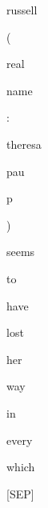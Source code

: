 \documentclass[varwidth=150mm]{standalone}
\begin{document}
\begin{CJK*}{UTF8}{gbsn}
{{{\colorbox{red!6.251659393310547}{\strut russell} \colorbox{red!24.858978271484375}{\strut (} \colorbox{red!7.129275321960449}{\strut real} \colorbox{red!2.2108402252197266}{\strut name} \colorbox{red!7.296480178833008}{\strut :} \colorbox{red!2.3750362396240234}{\strut theresa} \colorbox{red!0.0}{\strut pau}\colorbox{red!5.593570709228516}{\strut p} \colorbox{red!3.8273732662200928}{\strut )} \colorbox{red!5.125519752502441}{\strut seems} \colorbox{red!0.0}{\strut to} \colorbox{red!5.5991973876953125}{\strut have} \colorbox{red!0.0}{\strut lost} \colorbox{red!2.465573787689209}{\strut her} \colorbox{red!0.0}{\strut way} \colorbox{red!1.8739957809448242}{\strut in} \colorbox{red!5.08909797668457}{\strut every} \colorbox{red!1.8376708030700684}{\strut which} \colorbox{red!8.444137573242188}{\strut [SEP]}
}}}
\end{CJK*}
\end{document}
